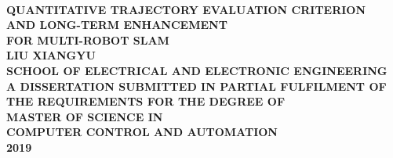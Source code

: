 \begin{titlepage}

\centering


~\\[1in]
\large{\selectfont
	\uppercase{\textbf{Quantitative Trajectory Evaluation Criterion\\and Long-term Enhancement\\ for Multi-Robot SLAM}}}\\[3in]



\small{\selectfont
		\uppercase{\textbf{Liu Xiangyu\\[0.5in]
SCHOOL OF ELECTRICAL AND ELECTRONIC ENGINEERING\\[0.25in]
A DISSERTATION SUBMITTED IN PARTIAL FULFILMENT OF \\
THE REQUIREMENTS FOR THE DEGREE OF \\
MASTER OF SCIENCE IN \\
COMPUTER CONTROL AND AUTOMATION\\[0.25in]
2019}}}
\newpage
\end{titlepage}